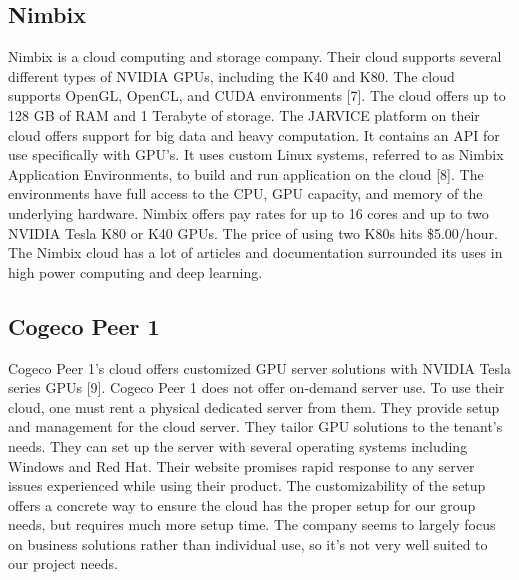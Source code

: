 \subsection{Nimbix}
Nimbix is a cloud computing and storage company. 
Their cloud supports several different types of NVIDIA GPUs, including the K40 and K80. 
The cloud supports OpenGL, OpenCL, and CUDA environments [7]. 
The cloud offers up to 128 GB of RAM and 1 Terabyte of storage. 
The JARVICE platform on their cloud offers support for big data and heavy computation. 
It contains an API for use specifically with GPU’s. 
It uses custom Linux systems, referred to as Nimbix Application Environments, to build and run application on the cloud [8]. 
The environments have full access to the CPU, GPU capacity, and memory of the underlying hardware. 
Nimbix offers pay rates for up to 16 cores and up to two NVIDIA Tesla K80 or K40 GPUs. 
The price of using two K80s hits \$5.00/hour. 
The Nimbix cloud has a lot of articles and documentation surrounded its uses in high power computing and deep learning.

\subsection{Cogeco Peer 1}
Cogeco Peer 1’s cloud offers customized GPU server solutions with NVIDIA Tesla series GPUs [9]. 
Cogeco Peer 1 does not offer on-demand server use. 
To use their cloud, one must rent a physical dedicated server from them. 
They provide setup and management for the cloud server.
They tailor GPU solutions to the tenant’s needs. 
They can set up the server with several operating systems including Windows and Red Hat. 
Their website promises rapid response to any server issues experienced while using their product. 
The customizability of the setup offers a concrete way to ensure the cloud has the proper setup for our group needs, but requires much more setup time. 
The company seems to largely focus on business solutions rather than individual use, so it’s not very well suited to our project needs.

